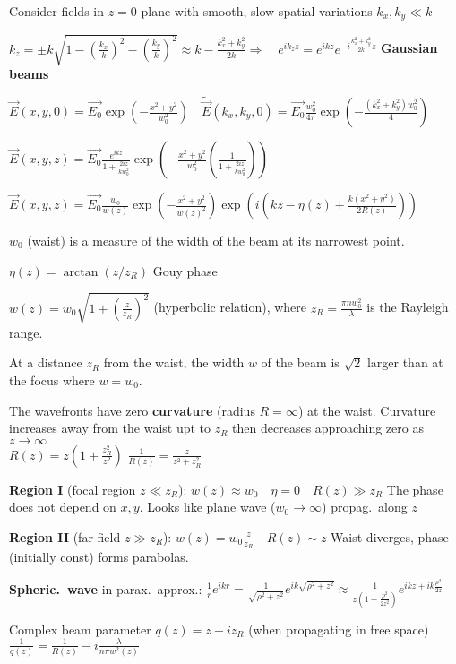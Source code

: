 \begin{squishlist}
    \item Consider fields in $z=0$ plane with smooth, slow spatial variations $k_x, k_y \ll k$
    \item $k_z = \pm k \sqrt{1 - \left(\frac{k_x}{k}\right)^2 - \left(\frac{k_y}{k}\right)^2}\approx k - \tfrac{k_x^2 + k_y^2}{2k} \Rightarrow \quad e^{ik_z z} = e^{ikz}e^{-i \tfrac{k_x^2 + k_y^2}{2k}z}$ \textbf{Gaussian beams}
    \item $\vec{E}(x,y,0) = \vec{E_0} \exp\left({-\tfrac{x^2 + y^2}{w_0^2}}\right) \quad \tilde{\vec{E}}(k_x,k_y,0) = \vec{E_0} \frac{w_0^2}{4\pi} \exp \left(- \frac{(k_x^2 + k_y^2)w_0^2}{4}\right)$
    \item $\vec{E}(x,y,z) = \vec{E_0} \frac{e^{ikz}}{1 + \tfrac{2iz}{kw_0^2}} \exp\left({-\tfrac{x^2 + y^2}{w_0^2}\left(\tfrac{1}{1 + \tfrac{2iz}{kw_0^2}}\right)}\right)$
    \item $\vec{E}(x,y,z) = \vec{E_0} \frac{w_0}{w(z)}\exp\left(-\frac{x^2 + y^2}{w(z)^2}\right) \exp \left(i \left(kz - \eta(z) + \frac{k(x^2 + y^2)}{2 R(z)}\right)\right)$
    \item $w_0$ (waist) is a measure of the width of the beam at its narrowest point.
    \item $\eta(z) = \arctan (z/z_R)$ Gouy phase
    \item $w(z) = w_0 \sqrt{1 + \left(\frac{z}{z_R}\right)^2}$ (hyperbolic relation), where $z_R = \frac{\pi n w_0^2}{\lambda}$ is the Rayleigh range.
    \item At a distance $z_R$ from the waist, the width $w$ of the beam is $\sqrt{2}$ larger than at the focus where $w=w_0$.
    \item The wavefronts have zero \textbf{curvature} (radius $R = \infty$) at the waist. Curvature increases away from the waist upt to $z_R$ then decreases approaching zero as $z \rightarrow \infty$ \\
    $R(z) = z \left(1 + \frac{z_R^2}{z^2}\right)$ \qquad$\frac{1}{R(z)} = \frac{z}{z^2 + z^2_R}$

    \item \textbf{Region I} (focal region $z \ll z_R$): $w(z) \approx w_0 \quad \eta=0 \quad R(z) \gg z_R$ \quad The phase does not depend on $x,y$. Looks like plane wave ($w_0 \rightarrow \infty$) propag.\ along $z$
    \item \textbf{Region II} (far-field $z \gg z_R$): $w(z) = w_0 \frac{z}{z_R} \quad R(z) \sim z$ \quad Waist diverges, phase (initially const) forms parabolas.
    \item \textbf{Spheric.\ wave} in parax.\ approx.: $\frac{1}{r}e^{ikr} = \frac{1}{\sqrt{\rho^2 + z^2}}e^{ik \sqrt{\rho^2 + z^2}} \approx \frac{1}{z \left(1 + \frac{p^2}{2z^2}\right)}e^{ikz+ik\frac{\rho^2}{2z}}$
    \item Complex beam parameter $q(z) = z + i z_R$ (when propagating in free space) \\ $\frac{1}{q(z)} = \frac{1}{R(z)} - i \frac{\lambda}{n \pi w^2(z)}$
\end{squishlist}

